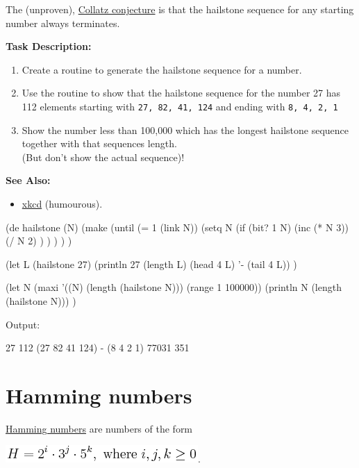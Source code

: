 The (unproven),
\href{http://en.wikipedia.org/wiki/Collatz\_conjecture}{Collatz
  conjecture} is that the hailstone sequence for any starting number
always terminates.

\textbf{Task Description:}

\begin{enumerate}
\item
  Create a routine to generate the hailstone sequence for a number.
\item
  Use the routine to show that the hailstone sequence for the number 27
  has 112 elements starting with \texttt{27, 82, 41, 124} and ending
  with \texttt{8, 4, 2, 1}
\item
  Show the number less than 100,000 which has the longest hailstone
  sequence together with that sequences length.\\ (But don't show the
  actual sequence)!
\end{enumerate}

\textbf{See Also:}

\begin{itemize}
\item
  \href{http://xkcd.com/710}{xkcd} (humourous).
\end{itemize}

\begin{wideverbatim}

(de hailstone (N)
   (make
      (until (= 1 (link N))
         (setq N
            (if (bit? 1 N)
               (inc (* N 3))
               (/ N 2) ) ) ) ) )

(let L (hailstone 27)
   (println 27 (length L) (head 4 L) '- (tail 4 L)) )

(let N (maxi '((N) (length (hailstone N))) (range 1 100000))
   (println N (length (hailstone N))) )

Output:

27 112 (27 82 41 124) - (8 4 2 1)
77031 351

\end{wideverbatim}

\pagebreak{}
\section*{Hamming numbers}

\href{http://en.wikipedia.org/wiki/Hamming\_numbers\#Algorithms}{Hamming
numbers} are numbers of the form

\includegraphics[scale=.6]{graphics/27c40c22beaf5d82e9aabf41eb7d92a2.png}.

